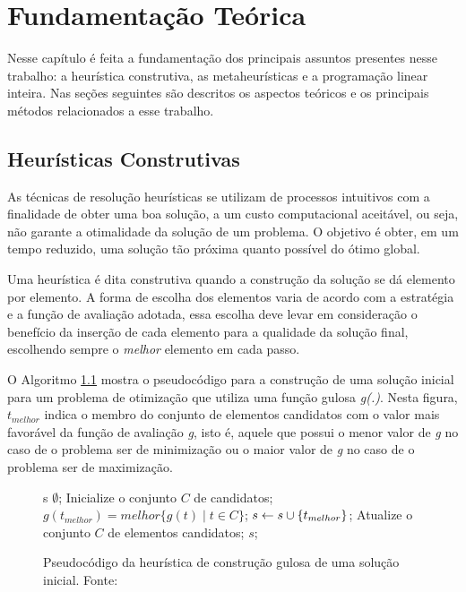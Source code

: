 \chapter{Fundamentação Teórica}

Nesse capítulo é feita a fundamentação dos principais assuntos presentes nesse
trabalho: a heurística construtiva, as metaheurísticas e a programação
linear inteira. Nas seções seguintes são descritos os aspectos teóricos e os
principais métodos relacionados a esse trabalho.

\section{Heurísticas Construtivas}
As técnicas de resolução heurísticas se utilizam de processos intuitivos com a
finalidade de obter uma boa solução, a um custo computacional aceitável, ou
seja, não garante a otimalidade da solução de um problema. O objetivo é obter,
em um tempo reduzido, uma solução tão próxima quanto possível do ótimo global.
		
Uma heurística é dita construtiva quando a construção da solução se dá elemento
por elemento. A forma de escolha dos elementos varia de acordo com a
estratégia e a função de avaliação adotada, essa escolha deve levar em
consideração o benefício da inserção de cada elemento para a qualidade da
solução final, escolhendo sempre o \emph{melhor} elemento em cada passo.
		
O Algoritmo \ref{alg:heurconsgulosa} mostra o pseudocódigo para a construção de
uma solução inicial para um problema de otimização que utiliza uma função
gulosa \emph{g(.)}. Nesta figura, \emph{$t_{melhor}$} indica o membro do
conjunto de elementos candidatos com o valor mais favorável da função de
avaliação \emph{g}, isto é, aquele que possui o menor valor de \emph{g} no caso
de o problema ser de minimização ou o maior valor de \emph{g} no caso de o
problema ser de maximização.


\begin{figure}[h]
\caption{Pseudocódigo da heurística de construção gulosa de uma solução
inicial. \newline \mbox{Fonte:
\cite{notasmarcone}} }\label{alg:heurconsgulosa}
\begin{programma}
\STATE s \GETS $\emptyset$;
\STATE Inicialize o conjunto $C$ de candidatos;
\STATE $g(t_{melhor}) = melhor\{g(t) \mid t \in C\}$;
\STATE $s \leftarrow s \cup \{t_{melhor}\}$;
\STATE Atualize o conjunto $C$ de elementos candidatos;
\ENDWHILE
\STATE\RETURN $s$;
\ENDALGORITHM
\end{programma}
\end{figure}		
		

